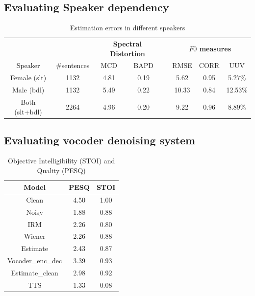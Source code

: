\documentclass{article}
\begin{document}
\subsection{Evaluating Speaker dependency}
\begin{table}[hbt]
    \centering
    \begin{tabular}{cccccccc} \toprule
& & \multicolumn{2}{c}{\bfseries Spectral Distortion} & \phantom{abc}& \multicolumn{3}{c}{\bfseries $F0$ measures}\\
\cmidrule{3-4}  \cmidrule{6-8}
    Speaker & \#sentences & MCD & BAPD && RMSE & CORR & UUV \\
     \midrule
    Female (slt)    & 1132 & 4.81 & 0.19 && 5.62  & 0.95 & 5.27\% \\
    Male (bdl)      & 1132 & 5.49 & 0.22 && 10.33 & 0.84 & 12.53\%\\
    Both (slt+bdl)  & 2264 & 4.96 & 0.20 && 9.22  & 0.96 & 8.89\%\\ \bottomrule
    \end{tabular}
    \caption{Estimation errors in different speakers}
    \label{tab:speaker}
\end{table}

\subsection{Evaluating vocoder denoising system}

\begin{table}[hbt]
    \centering
\begin{tabular}{ccc}
\toprule
Model & PESQ & STOI \\
\midrule
Clean               & 4.50 & 1.00 \\
Noisy               & 1.88 & 0.88\\
IRM                 & 2.26 & 0.80\\
Wiener              & 2.26 & 0.88 \\
Estimate            & 2.43 & 0.87 \\
Vocoder\_enc\_dec   & 3.39 & 0.93 \\
Estimate\_clean     & 2.98 & 0.92\\
TTS                 & 1.33 & 0.08\\
\bottomrule
\end{tabular}
\caption{ Objective Intelligibility (STOI) and Quality (PESQ)}
\label{tab:obj_denoise}
\end{table}
\end{document}
